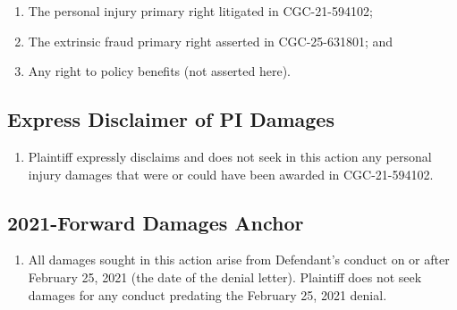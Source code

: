 \begin{enumerate}
\def\labelenumi{(\alph{enumi})}
\tightlist
\item
  The personal injury primary right litigated in CGC-21-594102;
\item
  The extrinsic fraud primary right asserted in CGC-25-631801; and
\item
  Any right to policy benefits (not asserted here).
\end{enumerate}

\subsection{Express Disclaimer of PI Damages}\label{express-disclaimer-of-pi-damages}

\begin{enumerate}
\def\labelenumi{\arabic{enumi}.}
\setcounter{enumi}{42}
\tightlist
\item
  Plaintiff expressly disclaims and does not seek in this action any personal injury damages that were or could have been awarded in CGC-21-594102.
\end{enumerate}

\subsection{2021-Forward Damages Anchor}\label{forward-damages-anchor}

\begin{enumerate}
\def\labelenumi{\arabic{enumi}.}
\setcounter{enumi}{43}
\tightlist
\item
  All damages sought in this action arise from Defendant's conduct on or after February 25, 2021 (the date of the denial letter). Plaintiff does not seek damages for any conduct predating the February 25, 2021 denial.
\end{enumerate}

